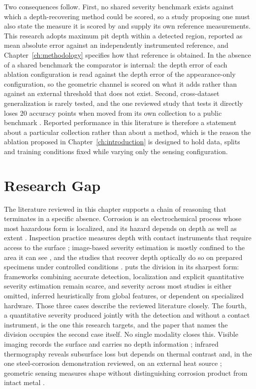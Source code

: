 Two consequences follow. First, no shared severity benchmark exists against
which a depth-recovering method could be scored, so a study proposing one must
also state the measure it is scored by and supply its own reference
measurements. This research adopts maximum pit depth within a detected region,
reported as mean absolute error against an independently instrumented
reference, and Chapter~\ref{ch:methodology} specifies how that reference is
obtained. In the absence of a shared benchmark the comparator is internal: the
depth error of each ablation configuration is read against the depth error of
the appearance-only configuration, so the geometric channel is scored on what it
adds rather than against an external threshold that does not exist. Second, cross-dataset generalization is
rarely tested, and the one reviewed study that tests it directly loses 20
accuracy points when moved from its own collection to a public benchmark
\citep{Zhang2026b}. Reported performance in this literature is therefore a statement about
a particular collection rather than about a method, which is the reason the
ablation proposed in Chapter~\ref{ch:introduction} is designed to hold data,
splits and training conditions fixed while varying only the sensing
configuration.

\section{Research Gap}
\label{sec:lr-gap}

The literature reviewed in this chapter supports a chain of reasoning that
terminates in a specific absence. Corrosion is an electrochemical process whose
most hazardous form is localized, and its hazard depends on depth as well as extent
\citep{Qin2026,Liu2026,Wang2021,Akhlaghi2023}. Inspection practice measures depth
with contact instruments that require access to the surface
\citep{Huang2026a,Yang2025}; image-based severity estimation is mostly confined
to the area it can see \citep{Alvani2026}, and the studies that recover depth
optically do so on prepared specimens under controlled conditions
\citep{Egodawela2025,Doshvarpassand2022,Haitz2022,Maru2025}. \citet{Alvani2026} puts the
division in its sharpest form: frameworks combining accurate detection,
localization and explicit quantitative severity estimation remain scarce, and
severity across most studies is either omitted, inferred heuristically from
global features, or dependent on specialized hardware. Those three cases
describe the reviewed literature closely. The fourth, a quantitative severity
produced jointly with the detection and without a contact instrument, is the one
this research targets, and the paper that names the division occupies the second
case itself. No single modality closes this. Visible imaging
records the surface and carries no depth information \citep{Cheng2025}; infrared
thermography reveals subsurface loss but depends on thermal contrast and, in the
one steel-corrosion demonstration reviewed, on an external heat source
\citep{Lim2021,Doshvarpassand2022}; geometric sensing measures shape without distinguishing corrosion
product from intact metal \citep{Maru2025,PimenteldeFigueiredo2025}.

